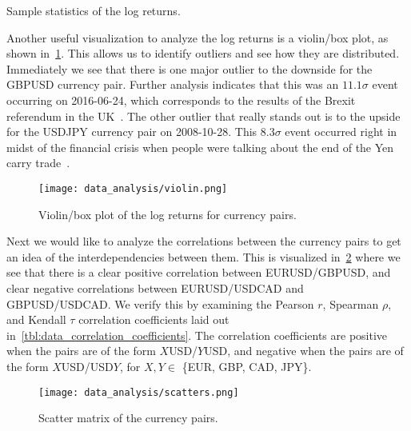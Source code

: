 \begin{table}[!htb]
    \centering
    \begin{adjustbox}{max width=\textwidth}
        
    \end{adjustbox}
    \caption{Sample statistics of the log returns.}
    \label{tbl:data_log_returns_raw_stats}
\end{table}

Another useful visualization to analyze the log returns is a violin/box plot, as shown in~\cref{fig:violin_raw}.
This allows us to identify outliers and see how they are distributed.
Immediately we see that there is one major outlier to the downside for the GBPUSD currency pair.
Further analysis indicates that this was an \( 11.1\sigma \) event occurring on 2016-06-24, which corresponds to the results of the Brexit referendum in the UK~\cite{brexit_gov_uk}.
The other outlier that really stands out is to the upside for the USDJPY currency pair on 2008-10-28.
This \( 8.3\sigma \) event occurred right in midst of the financial crisis when people were talking about the end of the Yen carry trade~\cite{jpy_carry_trade_nyt}.
\begin{figure}[!htb]
    \begin{center}
        \texttt{[image: data\_analysis/violin.png]}
    \end{center}
    \caption{Violin/box plot of the log returns for currency pairs.}
    \label{fig:violin_raw}
\end{figure}

Next we would like to analyze the correlations between the currency pairs to get an idea of the interdependencies between them.
This is visualized in~\cref{fig:scatters} where we see that there is a clear positive correlation between EURUSD/GBPUSD, and clear negative correlations between EURUSD/USDCAD and GBPUSD/USDCAD.
We verify this by examining the Pearson \( r \), Spearman \( \rho \), and Kendall \( \tau \) correlation coefficients laid out in~\cref{tbl:data_correlation_coefficients}.
The correlation coefficients are positive when the pairs are of the form \( X \)USD/\( Y \)USD, and negative when the pairs are of the form \( X \)USD/USD\( Y \), for \( X,Y \in \) \{EUR, GBP, CAD, JPY\}.
\begin{figure}[!htb]
    \begin{center}
        \texttt{[image: data\_analysis/scatters.png]}
    \end{center}
    \caption{Scatter matrix of the currency pairs.}
    \label{fig:scatters}
\end{figure}

